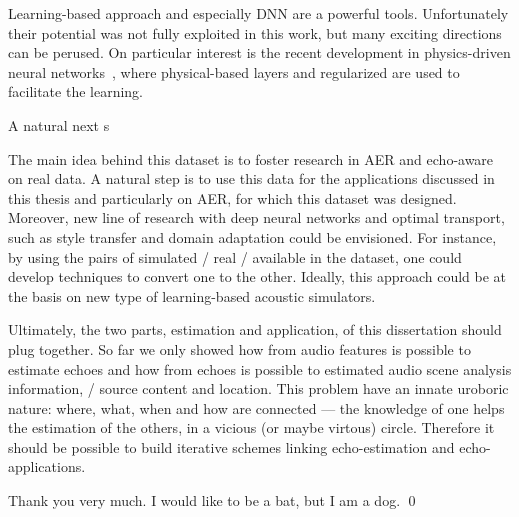 \noindent Learning-based approach and especially \acf{DNN} are a powerful tools.
Unfortunately their potential was not fully exploited in this work, but many exciting directions can be perused.
On particular interest is the recent development in physics-driven neural networks~,
where physical-based layers and regularized are used to facilitate the learning.

A natural next s


The main idea behind this dataset is to foster research in \ac{AER} and echo-aware on real data.
A natural step is to use this data for the applications discussed in this thesis and particularly on \ac{AER}, for which this dataset was designed.
Moreover, new line of research with deep neural networks and optimal transport, such as style transfer and domain adaptation could be envisioned.
For instance, by using the pairs of simulated \vs/ real \RIRs/ available in the dataset, one could develop techniques to convert one to the other.
Ideally, this approach could be at the basis on new type of learning-based acoustic simulators.


Ultimately, the two parts, estimation and application, of this dissertation should plug together.
So far we only showed how from audio features is possible to estimate echoes and how from echoes is possible to estimated audio scene analysis information, \eg/ source content and location.
This problem have an innate uroboric nature: where, what, when and how are connected --- the knowledge of one helps the estimation of the others, in a vicious (or maybe virtous) circle.
Therefore it should be possible to build iterative schemes linking echo-estimation and echo-applications.

\mynewline
Thank you very much. I would like to be a bat, but I am a dog.
\qed
